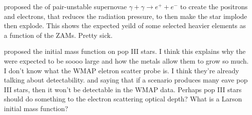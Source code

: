     \citet{2002ApJ...571...30S} proposed the of pair-unstable supernovae $\gamma + \gamma \rightarrow e^{+} + e^{-}$ to create the positrons and electrons, that reduces the radiation pressure, to then make the star implode then explode. This shows the expected yeild of some selected heavier elements as a function of the ZAMs. Pretty sick. 
    
    \citet{2006MNRAS.369..825S} proposed the initial mass function on pop III stars. I think this explains why the were expected to be soooo large and how the metals allow them to grow so much. I don't know what the  WMAP eletron scatter probe is. I think they're already talking about detectability. and saying that if a scenario produces many eave pop III stars, then it won't be detectable in the WMAP data. Perhaps pop III stars should do something to the electron scattering optical depth? What is a Larson initial mass function?  







